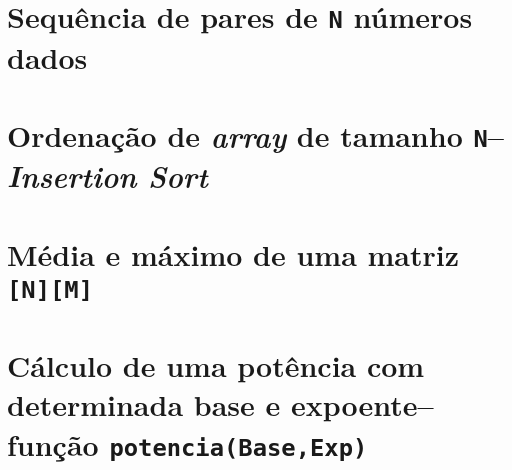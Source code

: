 \section{Sequência de pares de \texttt{N} números dados}
\label{appendix:d:sec:d3}


\section{Ordenação de \emph{array} de tamanho \texttt{N}--\emph{Insertion Sort}}
\label{appendix:d:sec:d4}

\section{Média e máximo de uma matriz \texttt{[N][M]}}
\label{appendix:d:sec:d5}



\section{Cálculo de uma potência com determinada base e expoente--função
	\texttt{potencia(Base,Exp)}}
\label{appendix:d:sec:d6}



